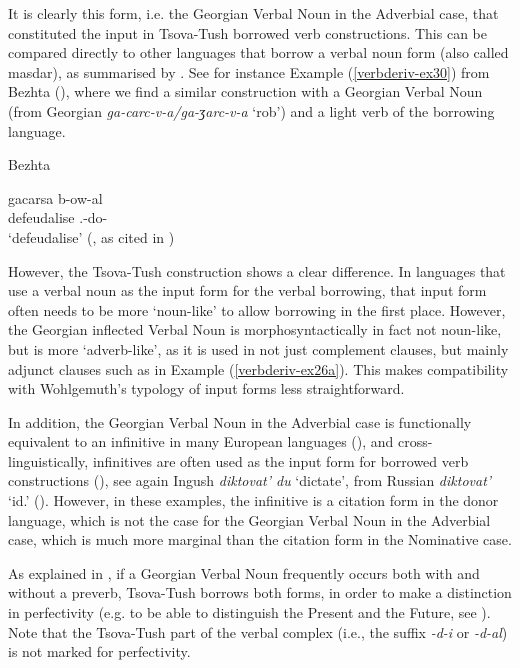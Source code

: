 It is clearly this form, i.e. the Georgian Verbal Noun in the Adverbial case, that constituted the input in Tsova-Tush borrowed verb constructions. This can be compared directly to other languages that borrow a verbal noun form (also called masdar), as summarised by \textcite[84]{wohlgemut09loanverbtyp}. See for instance Example (\ref{verbderiv-ex30}) from Bezhta (\cites[101]{khalilov04contact}), where we find a similar construction with a Georgian Verbal Noun (from Georgian \textit{ga-carc-v-a/ga-ʒarc-v-a} `rob') and a light verb of the borrowing language.


	\begin{exe}
		\ex\label{verbderiv-ex30}
		Bezhta
        
		\gll  gacarsa b-ow-al \\
		defeudalise {\B}.{\Sg}-do-{\Inf} \\
		\trans `defeudalise'
		\hfill (\cites[101]{khalilov04contact}, as cited in \cites[85]{wohlgemut09loanverbtyp})
	\end{exe}


However, the Tsova-Tush construction shows a clear difference. In languages that use a verbal noun as the input form for the verbal borrowing, that input form often needs to be more `noun-like' to allow borrowing in the first place. However, the Georgian inflected Verbal Noun is morphosyntactically in fact not noun-like, but is more `adverb-like', as it is used in not just complement clauses, but mainly adjunct clauses such as in Example (\ref{verbderiv-ex26a}). This makes compatibility with Wohlgemuth's typology of input forms less straightforward. 

In addition, the Georgian Verbal Noun in the Adverbial case is functionally equivalent to an infinitive in many European languages (\cites{gippertOGeo}), and cross-linguistically, infinitives are often used as the input form for borrowed verb constructions (\cites[80]{wohlgemut09loanverbtyp}), see again Ingush \textit{diktovat' du} `dictate', from Russian \textit{diktovat'} `id.' (\cites[337]{nichols11}).  However, in these examples, the infinitive is a citation form in the donor language, which is not the case for the Georgian Verbal Noun in the Adverbial case, which is much more marginal than the citation form in the Nominative case.

As explained in , if a Georgian Verbal Noun frequently occurs both with and without a preverb, Tsova-Tush borrows both forms, in order to make a distinction in perfectivity (e.g. to be able to distinguish the Present and the Future, see ). Note that the Tsova-Tush part of the verbal complex (i.e., the suffix \textit{-d-i} or \textit{-d-al}) is not marked for perfectivity.

